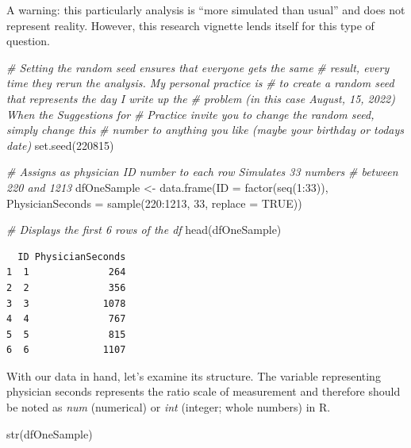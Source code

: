 \documentclass[
  11pt,
]{book}
\newenvironment{Shaded}{\begin{snugshade}}{\end{snugshade}}
\newcommand{\AttributeTok}[1]{\textcolor[rgb]{0.77,0.63,0.00}{#1}}
\newcommand{\CommentTok}[1]{\textcolor[rgb]{0.56,0.35,0.01}{\textit{#1}}}
\newcommand{\ConstantTok}[1]{\textcolor[rgb]{0.00,0.00,0.00}{#1}}
\newcommand{\DecValTok}[1]{\textcolor[rgb]{0.00,0.00,0.81}{#1}}
\newcommand{\FunctionTok}[1]{\textcolor[rgb]{0.00,0.00,0.00}{#1}}
\newcommand{\NormalTok}[1]{#1}
\newcommand{\OtherTok}[1]{\textcolor[rgb]{0.56,0.35,0.01}{#1}}
\newcommand{\SpecialCharTok}[1]{\textcolor[rgb]{0.00,0.00,0.00}{#1}}
\begin{document}
A warning: this particularly analysis is ``more simulated than usual'' and does not represent reality. However, this research vignette lends itself for this type of question.

\begin{Shaded}
\begin{Highlighting}[]
\CommentTok{\# Setting the \textquotesingle{}random\textquotesingle{} seed ensures that everyone gets the same}
\CommentTok{\# result, every time they rerun the analysis. My personal practice is}
\CommentTok{\# to create a random seed that represents the day I write up the}
\CommentTok{\# problem (in this case August, 15, 2022) When the Suggestions for}
\CommentTok{\# Practice invite you to \textquotesingle{}change the random seed,\textquotesingle{} simply change this}
\CommentTok{\# number to anything you like (maybe your birthday or today\textquotesingle{}s date)}
\FunctionTok{set.seed}\NormalTok{(}\DecValTok{220815}\NormalTok{)}

\CommentTok{\# Assigns as physician ID number to each row Simulates 33 numbers}
\CommentTok{\# between 220 and 1213}
\NormalTok{dfOneSample }\OtherTok{\textless{}{-}} \FunctionTok{data.frame}\NormalTok{(}\AttributeTok{ID =} \FunctionTok{factor}\NormalTok{(}\FunctionTok{seq}\NormalTok{(}\DecValTok{1}\SpecialCharTok{:}\DecValTok{33}\NormalTok{)), }\AttributeTok{PhysicianSeconds =} \FunctionTok{sample}\NormalTok{(}\DecValTok{220}\SpecialCharTok{:}\DecValTok{1213}\NormalTok{,}
    \DecValTok{33}\NormalTok{, }\AttributeTok{replace =} \ConstantTok{TRUE}\NormalTok{))}

\CommentTok{\# Displays the first 6 rows of the df}
\FunctionTok{head}\NormalTok{(dfOneSample)}
\end{Highlighting}
\end{Shaded}

\begin{verbatim}
  ID PhysicianSeconds
1  1              264
2  2              356
3  3             1078
4  4              767
5  5              815
6  6             1107
\end{verbatim}

With our data in hand, let's examine its structure. The variable representing physician seconds represents the ratio scale of measurement and therefore should be noted as \emph{num} (numerical) or \emph{int} (integer; whole numbers) in R.

\begin{Shaded}
\begin{Highlighting}[]
\FunctionTok{str}\NormalTok{(dfOneSample)}
\end{Highlighting}
\end{Shaded}
\end{document}
